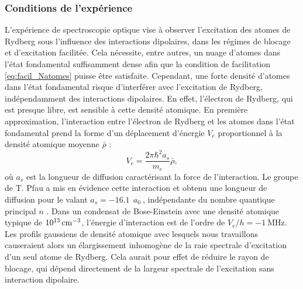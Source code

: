 	\subsubsection*{Conditions de l'expérience}
\noindent	L'expérience de spectroscopie optique vise à observer l'excitation des atomes de Rydberg sous l'influence des interactions dipolaires, dans les régimes de blocage et d'excitation facilitée.
Cela nécessite, entre autres, un nuage d'atomes dans l'état fondamental suffisamment dense afin que la condition de facilitation \eqref{eq:facil_Natomes} puisse être satisfaite.
Cependant, une forte densité d'atomes dans l'état fondamental risque d'interférer avec l'excitation de Rydberg, indépendamment des interactions dipolaires.
En effet, l'électron de Rydberg, qui est presque libre, est sensible à cette densité atomique.
En première approximation, l'interaction entre l'électron de Rydberg et les atomes dans l'état fondamental prend la forme d'un déplacement d'énergie $V_e$ proportionnel à la densité atomique moyenne $\bar{\rho}$ \cite{MX_PFAURYDBERGBEC13} :
\begin{equation}
\label{eq:Pfau_shift}
V_e = \frac{2\pi \hbar ^2 a_s}{m_e} \bar{\rho},
\end{equation}
où $a_s$ est la longueur de diffusion caractérisant la force de l'interaction.
Le groupe de T. Pfau a mis en évidence cette interaction et obtenu une longueur de diffusion pour le  valant $a_s = -\SI{16.1}{}~a_0~$, indépendante du nombre quantique principal $n$ \cite{MX_PFAURYDBERGBEC13}.
Dans un condensat de Bose-Einstein avec une densité atomique typique de $\SI{e13}{\per \raiseto{3}\centi\meter}$, l'énergie d'interaction est de l'ordre de $V_e/h = -\SI{1}{\MHz}$.
Les profils gaussiens de densité atomique avec lesquels nous travaillons causeraient alors un élargissement inhomogène de la raie spectrale d'excitation d'un seul atome de Rydberg.
Cela aurait pour effet de réduire le rayon de blocage, qui dépend directement de la largeur spectrale de l'excitation sans interaction dipolaire.

